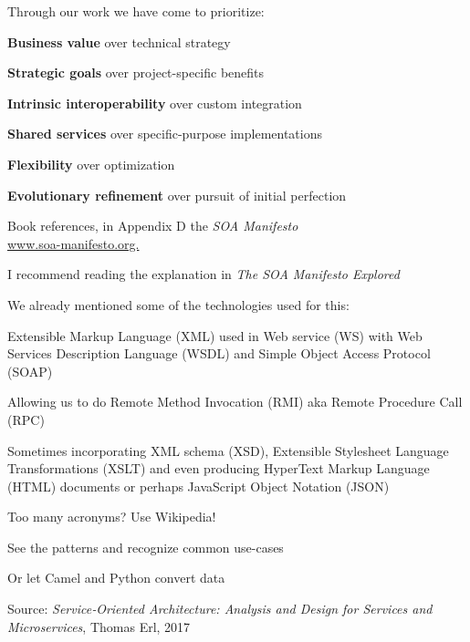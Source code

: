 \documentclass[Screen16to9,17pt]{foils}
\begin{document}

Through our work we have come to prioritize:
\begin{list2}
\item {\bf Business value} over technical strategy
\item {\bf Strategic goals} over project-specific benefits
\item {\bf Intrinsic interoperability} over custom integration
\item {\bf Shared services} over specific-purpose implementations
\item {\bf Flexibility} over optimization
\item {\bf Evolutionary refinement} over pursuit of initial perfection
\end{list2}

Book references, in Appendix D the \emph{SOA Manifesto}\\
\url{www.soa-manifesto.org.}

I recommend reading the explanation in \emph{The SOA Manifesto Explored}




We already mentioned some of the technologies used for this:
\begin{list2}
\item Extensible Markup Language (XML) used in Web service (WS) with Web Services Description Language (WSDL) and Simple Object Access Protocol (SOAP)
\item Allowing us to do Remote Method Invocation (RMI) aka Remote Procedure Call (RPC)
\item Sometimes incorporating XML schema (XSD), Extensible Stylesheet Language Transformations (XSLT) and even producing HyperText Markup Language (HTML) documents or perhaps JavaScript Object Notation (JSON)
\item Too many acronyms? Use Wikipedia!
\item See the patterns and recognize common use-cases
\item Or let Camel and Python convert data \smiley
\end{list2}


Source: \emph{Service‑Oriented Architecture: Analysis and Design for Services and Microservices}, Thomas Erl, 2017
\end{document}
